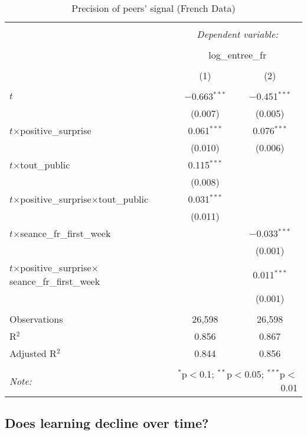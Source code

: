 \begin{table}[!htbp] \centering 
	\caption{Precision of peers' signal (French Data)} 
  \label{precisionsignal} 
\begin{tabular}{@{\extracolsep{0pt}}lcc} 
\\[-1.8ex]\hline 
\hline \\[-1.8ex] 
 & \multicolumn{2}{c}{\textit{Dependent variable:}} \\ 
\cline{2-3} 
\\[-1.8ex] & \multicolumn{2}{c}{log\_entree\_fr} \\ 
\\[-1.8ex] & (1) & (2)\\ 
\hline \\[-1.8ex] 
 $t$ & $-$0.663$^{***}$ & $-$0.451$^{***}$ \\ 
  & (0.007) & (0.005) \\ 
 $t$$\times$positive\_surprise & 0.061$^{***}$ & 0.076$^{***}$ \\ 
  & (0.010) & (0.006) \\ 
 $t$$\times$tout\_public & 0.115$^{***}$ &  \\ 
  & (0.008) &  \\ 
 $t$$\times$positive\_surprise$\times$tout\_public & 0.031$^{***}$ &  \\ 
  & (0.011) &  \\ 
 $t$$\times$seance\_fr\_first\_week &  & $-$0.033$^{***}$ \\ 
  &  & (0.001) \\ 
 $t$$\times$positive\_surprise$\times$seance\_fr\_first\_week &  & 0.011$^{***}$ \\ 
  &  & (0.001) \\ 
\hline \\[-1.8ex] 
Observations & 26,598 & 26,598 \\ 
R$^{2}$ & 0.856 & 0.867 \\ 
Adjusted R$^{2}$ & 0.844 & 0.856 \\ 
\hline 
\hline \\[-1.8ex] 
\textit{Note:}  & \multicolumn{2}{r}{$^{*}$p$<$0.1; $^{**}$p$<$0.05; $^{***}$p$<$0.01} \\ 
\end{tabular} 
\end{table}

\subsection{Does learning decline over time?}\label{subsec2.5}

